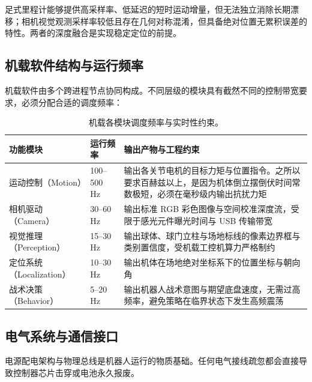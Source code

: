 足式里程计能够提供高采样率、低延迟的短时运动增量，但无法独立消除长期漂移；相机视觉观测采样率较低且存在几何对称混淆，但具备绝对位置无累积误差的特性。两者的深度融合是实现稳定定位的前提。

\subsection{机载软件结构与运行频率}

机载软件由多个跨进程节点协同构成。不同层级的模块具有截然不同的控制带宽要求，必须分配合适的调度频率：

\begin{table}[H]
\centering
\small
\begin{tabularx}{\textwidth}{p{2.6cm} p{2.2cm} X}
\toprule
\textbf{功能模块} & \textbf{运行频率} & \textbf{输出产物与工程约束} \\
\midrule
运动控制（Motion） & 100--500 Hz & 输出各关节电机的目标力矩与位置指令。之所以要求百赫兹以上，是因为机体倒立摆倒伏时间常数极短，必须在毫秒级内输出抗扰力矩 \\
\addlinespace
相机驱动（Camera） & 30--60 Hz & 输出标准 RGB 彩色图像与空间校准深度流，受限于感光元件曝光时间与 USB 传输带宽 \\
\addlinespace
视觉推理（Perception） & 15--30 Hz & 输出球体、球门立柱与场地标线的像素边界框与类别置信度，受机载工控机算力严格制约 \\
\addlinespace
定位系统（Localization） & 10--30 Hz & 输出机体在场地绝对坐标系下的位置坐标与朝向角 \\
\addlinespace
战术决策（Behavior） & 5--20 Hz & 输出机器人战术意图与期望底盘速度，无需过高频率，避免策略在临界状态下发生高频震荡 \\
\bottomrule
\end{tabularx}
\caption{机载各模块调度频率与实时性约束。}
\end{table}

\subsection{电气系统与通信接口}

电源配电架构与物理总线是机器人运行的物质基础。任何电气接线疏忽都会直接导致控制器芯片击穿或电池永久报废。

